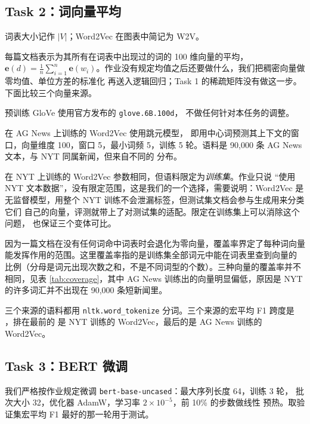 \documentclass[11pt]{article}
\newcommand{\code}[1]{\texttt{\small #1}}
\begin{document}


\subsection{Task 2：词向量平均}

词表大小记作 $|V|$；Word2Vec 在图表中简记为 W2V。

每篇文档表示为其所有在词表中出现过的词的 100 维向量的平均，
$\mathbf{e}(d) = \frac{1}{n}\sum_{i=1}^{n}\mathbf{e}(w_i)$。作业没有规定均值之后还要做什么，我们把稠密向量做零均值、单位方差的标准化
再送入逻辑回归；Task 1 的稀疏矩阵没有做这一步。下面比较三个向量来源。

预训练 GloVe\citep{pennington2014glove} 使用官方发布的 \code{glove.6B.100d}，
不做任何针对本任务的调整。

在 AG News 上训练的 Word2Vec\citep{mikolov2013efficient} 使用跳元模型，
即用中心词预测其上下文的窗口，向量维度 100，窗口 5，最小词频 5，训练 5 轮。语料是 90{,}000 条 AG News 文本，与 NYT 同属新闻，但来自不同的
分布。

在 NYT 上训练的 Word2Vec 参数相同，但语料限定为\emph{训练集}。作业只说
``使用 NYT 文本数据''，没有限定范围，这是我们的一个选择，需要说明：Word2Vec 是
无监督模型，用整个 NYT 训练不会泄漏标签，但测试集文档会参与生成用来分类它们
自己的向量，评测就带上了对测试集的适配。限定在训练集上可以消除这个问题，
也保证三个变体可比。

因为一篇文档在没有任何词命中词表时会退化为零向量，覆盖率界定了每种词向量
能发挥作用的范围。这里覆盖率指的是训练集全部词元中能在词表里查到向量的
比例（分母是词元出现次数之和，不是不同词型的个数）。三种向量的覆盖率并不
相同，见表 \ref{tab:coverage}，其中 AG News 训练出的向量明显偏低，原因是
NYT 的许多词汇并不出现在 90{,}000 条短新闻里。

三个来源的语料都用 \code{nltk.word\_tokenize} 分词。三个来源的宏平均 F1 跨度是 \resultEmbedSpread{}，排在最前的
是 NYT 训练的 Word2Vec，最后的是 AG News 训练的 Word2Vec。



\subsection{Task 3：BERT 微调}

我们严格按作业规定微调 \code{bert-base-uncased}\citep{devlin2019bert}：最大序列长度 64，训练 3 轮，
批次大小 32，优化器 AdamW，学习率 $2\times10^{-5}$，前 10\% 的步数做线性
预热。取验证集宏平均 F1 最好的那一轮用于测试。
\end{document}
